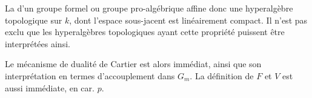 
La  d'un  groupe formel ou groupe pro-algébrique affine   donc une  hyperalgèbre topologique sur $k$, dont l'espace sous-jacent est linéairement compact. Il n'est pas exclu que les hyperalgèbres topologiques ayant cette propriété  puissent être interprétées ainsi. 

Le mécanisme de dualité de Cartier est alors immédiat, ainsi que son interprétation en termes d'accouplement dans $G_m$. La définition de $F$ et $V$ est aussi immédiate, en car. $p$.


